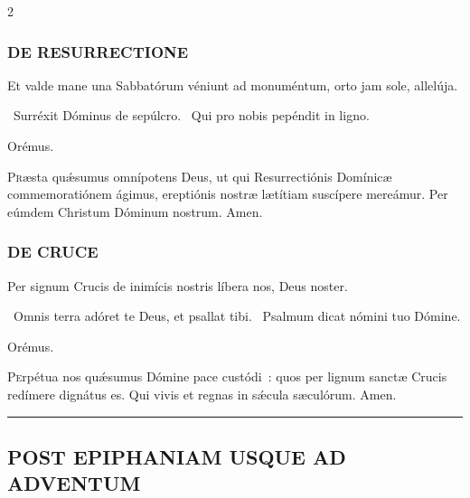 \documentclass[9pt,twoside]{extarticle}
\begin{document}
\begin{multicols}{2}
{{\subsubsection*{\center \textsc{DE RESURRECTIONE}}
\begin{tightlist}{}
\item {}
\item {} Et valde mane una Sabbatórum véniunt ad monuméntum, orto jam sole, allelúja.
\item {}~Surréxit Dóminus de sepúlcro. ~Qui pro nobis pepéndit in ligno.
\item Orémus. \hfill {}
\end{tightlist}
\lettrine{P}ræsta quǽsumus omnípotens Deus, ut qui Resurrectiónis Domínicæ commemoratiónem ágimus, ereptiónis nostræ lætítiam suscípere mereámur. Per eúmdem Christum Dóminum nostrum. Amen.

\subsubsection*{\center \textsc{DE CRUCE}}
\begin{tightlist}{}
\item {}
\item {} Per signum Crucis de inimícis nostris líbera nos, Deus noster.
\item {}~Omnis terra adóret te Deus, et psallat tibi. ~Psalmum dicat nómini tuo Dómine.
\item Orémus. \hfill {}
\end{tightlist}
\lettrine{P}erpétua nos quǽsumus Dómine pace custódi~: quos per lignum sanctæ Crucis redímere dignátus es. Qui vivis et regnas in sǽcula sæculórum. Amen.

\begin{center}\textcolor{red}{\rule{\linewidth}{0.5pt}} \end{center}

\subsection*{\center \textsc{POST EPIPHANIAM USQUE AD ADVENTUM}}
\begin{tightlist}{}
\item {}
\end{tightlist}

}}
\end{multicols}
\end{document}
